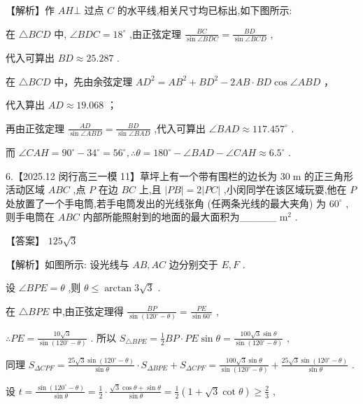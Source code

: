 \documentclass[10pt]{article}
\begin{document}
【解析】作 \({AH} \bot\) 过点 \(C\) 的水平线,相关尺寸均已标出,如下图所示:

在 \(\bigtriangleup {BCD}\) 中, \(\angle {BDC} = {18}^{ \circ  }\) ,由正弦定理 \(\frac{BC}{\sin \angle {BDC}} = \frac{BD}{\sin \angle {BCD}}\) ,

代入可算出 \({BD} \approx  {25.287}\) .

在 \(\bigtriangleup  {BCD}\) 中，先由余弦定理 \(A{D}^{2} = A{B}^{2} + B{D}^{2} - {2AB} \cdot  {BD}\cos \angle {ABD}\) ，

代入算出 \({AD} \approx  {19.068}\) ；

再由正弦定理 \(\frac{AD}{\sin \angle {ABD}} = \frac{BD}{\sin \angle {BAD}}\) ,代入可算出 \(\angle {BAD} \approx  {117.457}^{ \circ  }\) .

而 \(\angle {CAH} = {90}^{ \circ  } - {34}^{ \circ  } = {56}^{ \circ  },\therefore \theta  = {180}^{ \circ  } - \angle {BAD} - \angle {CAH} \approx  {6.5}^{ \circ  }\) .

6.【2025.12 闵行高三一模 11】草坪上有一个带有围栏的边长为 \({30}\mathrm{\;m}\) 的正三角形活动区域 \({ABC}\) ,点 \(P\) 在边 \({BC}\) 上,且 \(\left| {PB}\right|  = 2\left| {PC}\right|\) ,小闵同学在该区域玩耍,他在 \(P\) 处放置了一个手电筒,若手电筒发出的光线张角 (任两条光线的最大夹角) 为 \({60}^{ \circ  }\) ,则手电筒在 \({ABC}\) 内部所能照射到的地面的最大面积为\_\_\_\_\_ \({\mathrm{m}}^{2}\) .

【答案】 \({125}\sqrt{3}\)

【解析】如图所示: 设光线与 \({AB},{AC}\) 边分别交于 \(E,F\) .

设 \(\angle {BPE} = \theta\) ,则 \(\theta  \leq  \arctan 3\sqrt{3}\) .

在 \(\bigtriangleup {BPE}\) 中,由正弦定理得 \(\frac{BP}{\sin \left( {{120}^{ \circ  } - \theta }\right) } = \frac{PE}{\sin {60}^{ \circ  }}\) ,

\(\therefore {PE} = \frac{{10}\sqrt{3}}{\sin \left( {{120}^{ \circ  } - \theta }\right) }\) . 所以 \({S}_{\bigtriangleup {BPE}} = \frac{1}{2}{BP} \cdot  {PE}\sin \theta  = \frac{{100}\sqrt{3}\sin \theta }{\sin \left( {{120}^{ \circ  } - \theta }\right) }\) ,

同理 \({S}_{\Delta CPF} = \frac{{25}\sqrt{3}\sin \left( {{120}^{ \circ  } - \theta }\right) }{\sin \theta } \cdot  {S}_{\Delta BPE} + {S}_{\Delta CPF} = \frac{{100}\sqrt{3}\sin \theta }{\sin \left( {{120}^{ \circ  } - \theta }\right) } + \frac{{25}\sqrt{3}\sin \left( {{120}^{ \circ  } - \theta }\right) }{\sin \theta }\) .

设 \(t = \frac{\sin \left( {{120}^{ \circ  } - \theta }\right) }{\sin \theta } = \frac{1}{2} \cdot  \frac{\sqrt{3}\cos \theta  + \sin \theta }{\sin \theta } = \frac{1}{2}\left( {1 + \sqrt{3}\cot \theta }\right)  \geq  \frac{2}{3}\) ,
\end{document}
